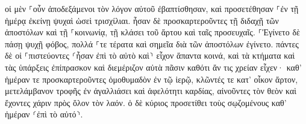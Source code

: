\documentclass{openreader}
\begin{document}
οἱ μὲν ⸀οὖν ἀποδεξάμενοι τὸν λόγον αὐτοῦ ἐβαπτίσθησαν, καὶ προσετέθησαν ⸀ἐν τῇ ἡμέρᾳ ἐκείνῃ ψυχαὶ ὡσεὶ τρισχίλιαι. 
ἦσαν δὲ προσκαρτεροῦντες τῇ διδαχῇ τῶν ἀποστόλων καὶ τῇ ⸀κοινωνίᾳ, τῇ κλάσει τοῦ ἄρτου καὶ ταῖς προσευχαῖς. 
⸀Ἐγίνετο δὲ πάσῃ ψυχῇ φόβος, πολλά ⸀τε τέρατα καὶ σημεῖα διὰ τῶν ἀποστόλων ἐγίνετο. 
πάντες δὲ οἱ ⸀πιστεύοντες ⸂ἦσαν ἐπὶ τὸ αὐτὸ καὶ⸃ εἶχον ἅπαντα κοινά, 
καὶ τὰ κτήματα καὶ τὰς ὑπάρξεις ἐπίπρασκον καὶ διεμέριζον αὐτὰ πᾶσιν καθότι ἄν τις χρείαν εἶχεν· 
καθ’ ἡμέραν τε προσκαρτεροῦντες ὁμοθυμαδὸν ἐν τῷ ἱερῷ, κλῶντές τε κατ’ οἶκον ἄρτον, μετελάμβανον τροφῆς ἐν ἀγαλλιάσει καὶ ἀφελότητι καρδίας, 
αἰνοῦντες τὸν θεὸν καὶ ἔχοντες χάριν πρὸς ὅλον τὸν λαόν. ὁ δὲ κύριος προσετίθει τοὺς σῳζομένους καθ’ ἡμέραν ⸂ἐπὶ τὸ αὐτό⸃. 
\end{document}
